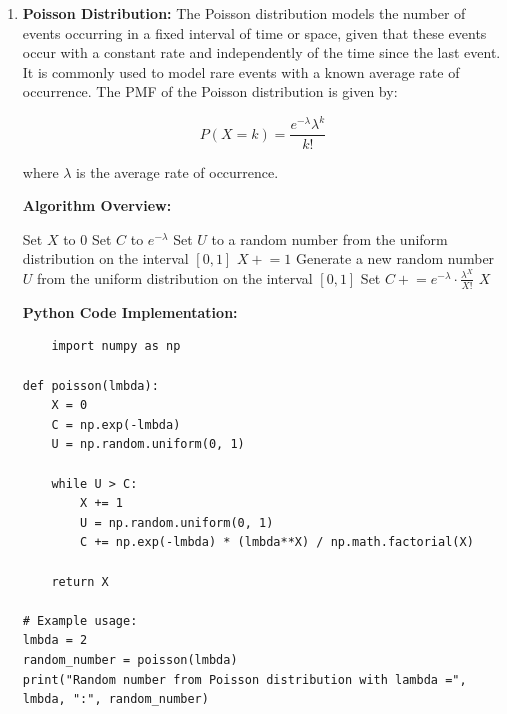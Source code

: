 \documentclass[12pt]{book} %
\begin{document}
\begin{enumerate}
\begin{lstlisting}
# Example usage:
mu = 0  # Mean of the normal distribution
sigma = 1  # Standard deviation of the normal distribution
random_number = normal(mu, sigma)
print("Random number from normal distribution:", random_number)
\end{lstlisting}
    
    \item \textbf{Poisson Distribution:} The Poisson distribution models the number of events occurring in a fixed interval of time or space, given that these events occur with a constant rate and independently of the time since the last event. It is commonly used to model rare events with a known average rate of occurrence. The PMF of the Poisson distribution is given by:
    
    \[
    P(X=k) = \frac{e^{-\lambda} \lambda^k}{k!}
    \]
    
    where \(\lambda\) is the average rate of occurrence.

\textbf{Algorithm Overview:}
    \FloatBarrier
\begin{algorithm}
\caption{Generating Random Numbers from a Poisson Distribution}
\begin{algorithmic}[1]
    \State Set \(X\) to 0
    \State Set \(C\) to \(e^{-\lambda}\)
    \State Set \(U\) to a random number from the uniform distribution on the interval \([0, 1]\)
        \State \(X \mathrel{+}= 1\)
        \State Generate a new random number \(U\) from the uniform distribution on the interval \([0, 1]\)
        \State Set \(C \mathrel{+}= e^{-\lambda} \cdot \frac{\lambda^X}{X!}\)
    \EndWhile
    \State \Return \(X\)
\EndProcedure
\end{algorithmic}
\end{algorithm}
\FloatBarrier
\textbf{Python Code Implementation:}
\FloatBarrier
\begin{lstlisting}
    import numpy as np

def poisson(lmbda):
    X = 0
    C = np.exp(-lmbda)
    U = np.random.uniform(0, 1)

    while U > C:
        X += 1
        U = np.random.uniform(0, 1)
        C += np.exp(-lmbda) * (lmbda**X) / np.math.factorial(X)

    return X

# Example usage:
lmbda = 2
random_number = poisson(lmbda)
print("Random number from Poisson distribution with lambda =", lmbda, ":", random_number)
\end{lstlisting}
\end{enumerate}
\end{document}
